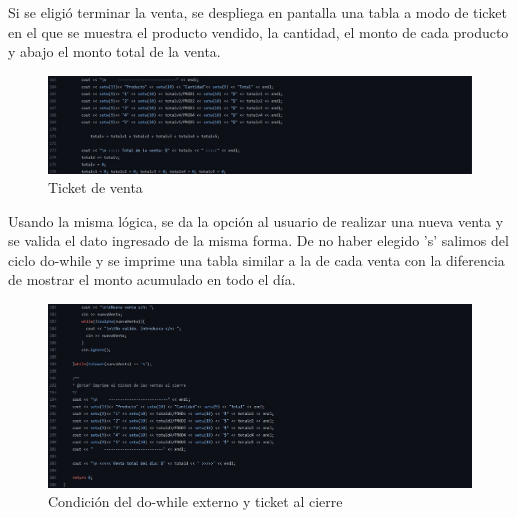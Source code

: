 \documentclass[12pt, letterpaper]{article}
\begin{document}
    \vspace{0.8cm}
    
    Si se eligió terminar la venta, se despliega en pantalla una tabla a modo de ticket en el que se muestra el producto vendido, la cantidad, el monto de cada producto y abajo el monto total de la venta.
    
    \newpage    
    
    \begin{figure}[h]
    \centering
    \includegraphics[width=16cm]{ticket1.jpg}
    \caption {Ticket de venta \label{fig:Fig11}}
    \end{figure}

    \vspace{0.8cm}
    
    Usando la misma lógica, se da la opción al usuario de realizar una nueva venta y se valida el dato ingresado de la misma forma. De no haber elegido 's' salimos del ciclo do-while y se imprime una tabla similar a la de cada venta con la diferencia de mostrar el monto acumulado en todo el día.
    
    \begin{figure}[h]
    \centering
    \includegraphics[width=16cm]{ticket2.jpg}
    \caption {Condición del do-while externo y ticket al cierre \label{fig:Fig12}}
    \end{figure}

    \vspace{0.8cm}
    
\end{document}

